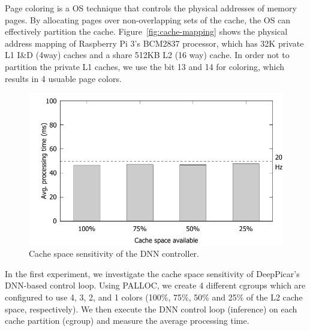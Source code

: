 Page coloring is a OS technique that controls the physical addresses
of memory pages. By allocating pages over non-overlapping sets of the
cache, the OS can effectively partition the cache.
Figure~\ref{fig:cache-mapping} shows the physical address
mapping of Raspberry Pi 3's BCM2837 processor, which has 32K private
L1 I\&D (4way) caches and a share 512KB L2 (16 way) cache. In order not
to partition the private L1 caches, we use the bit 13 and 14 for
coloring, which results in 4 usuable page colors.



\begin{figure}[h]
  \centering
  \includegraphics[width=.45\textwidth]{figs/palloc_multicore}
  \caption{Cache space sensitivity of the DNN controller. }
  \label{fig:palloc_multicore}
\end{figure}

In the first experiment, we investigate the cache space sensitivity of
DeepPicar's DNN-based control loop. Using PALLOC, we create 4
different cgroups which are configured to use 4, 3,
2, and 1 colors (100\%, 75\%, 50\% and 25\% of the L2 cache
space, respectively). We then execute the DNN control loop (inference)
on each cache partition (cgroup) and measure the average processing
time.

